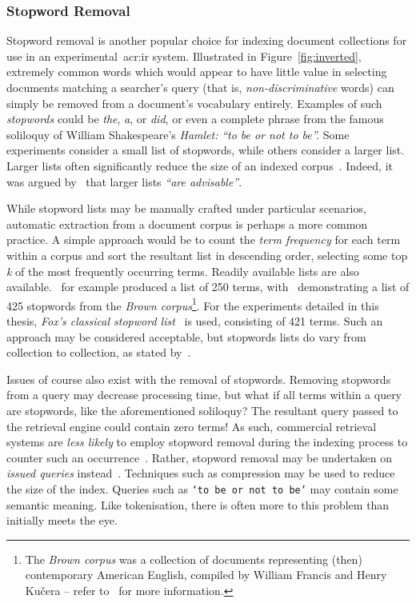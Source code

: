 \subsubsection{Stopword Removal}
Stopword removal is another popular choice for indexing document collections for use in an experimental~\gls{acr:ir} system. Illustrated in Figure~\ref{fig:inverted}, extremely common words which would appear to have little value in selecting documents matching a searcher's query (that is, \emph{non-discriminative} words) can simply be removed from a document's vocabulary entirely. Examples of such \emph{stopwords} could be \emph{the}, \emph{a}, or \emph{did}, or even a complete phrase from the famous soliloquy of William Shakespeare's \emph{Hamlet:} \emph{``to be or not to be''.} Some experiments consider a small list of stopwords, while others consider a larger list. Larger lists often significantly reduce the size of an indexed corpus~\citep{manning2008ir}. Indeed, it was argued by~\cite{fox1992stopwords} that larger lists \emph{``are advisable''}.

While stopword lists may be manually crafted under particular scenarios, automatic extraction from a document corpus is perhaps a more common practice. A simple approach would be to count the \emph{term frequency} for each term within a corpus and sort the resultant list in descending order, selecting some top \emph{k} of the most frequently occurring terms. Readily available lists are also available.~\cite{rijsbergen1979ir} for example produced a list of 250 terms, with~\cite{francis1985stopwords} demonstrating a list of 425 stopwords from the \emph{Brown corpus}\footnote{The \emph{Brown corpus} was a collection of documents representing (then) contemporary American English, compiled by William Francis and Henry Ku\v{c}era -- refer to~\cite{francis1979brown_manual} for more information.}. For the experiments detailed in this thesis, \emph{Fox's classical stopword list}~\citep{fox1992stopwords} is used, consisting of 421 terms. Such an approach may be considered acceptable, but stopwords lists do vary from collection to collection, as stated by~\cite{lo2005automatically}.

Issues of course also exist with the removal of stopwords. Removing stopwords from a query may decrease processing time, but what if all terms within a query are stopwords, like the aforementioned soliloquy? The resultant query passed to the retrieval engine could contain zero terms! As such, commercial retrieval systems are \emph{less likely} to employ stopword removal during the indexing process to counter such an occurrence~\citep{manning2008ir, dolamic2010stopword}. Rather, stopword removal may be undertaken on \emph{issued queries} instead~\citep{croft2009search}. Techniques such as compression may be used to reduce the size of the index. Queries such as \texttt{`to be or not to be'} may contain some semantic meaning. Like tokenisation, there is often more to this problem than initially meets the eye.

